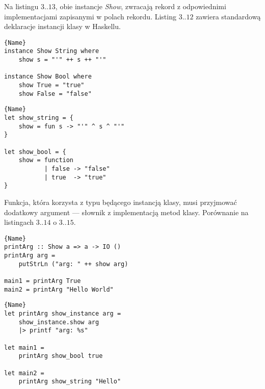 \documentclass[declaration,shortabstract]{iithesis}
\begin{document}
Na listingu $3..13$, obie instancje \textit{Show}, zwracają 
rekord z odpowiednimi implementacjami zapisanymi w polach rekordu. 
Listing $3..12$ zawiera standardową deklaracje instancji klasy w Haskellu.

\noindent\begin{minipage}{.45\textwidth}
\begin{lstlisting}[caption=Instancja klasy w Haskellu, frame=tlrb]{Name}
instance Show String where
    show s = "'" ++ s ++ "'"

instance Show Bool where
    show True = "true"
    show False = "false" 

\end{lstlisting}
\end{minipage}\hfill
\begin{minipage}{.45\textwidth}
\begin{lstlisting}[caption=Instancja klasy w OCamlu, frame=tlrb]{Name}
let show_string = {
    show = fun s -> "'" ^ s ^ "'"
}

let show_bool = {
    show = function 
           | false -> "false"
           | true  -> "true"
}

\end{lstlisting}
\end{minipage}

Funkcja, która korzysta z typu będącego instancją klasy, musi przyjmować 
dodatkowy argument --- słownik z implementacją metod klasy. Porównanie na 
listingach $3..14$ o $3..15$.

\noindent\begin{minipage}{.45\textwidth}
\begin{lstlisting}[caption=Instancja klasy w Haskellu., frame=tlrb]{Name}
printArg :: Show a => a -> IO ()
printArg arg = 
    putStrLn ("arg: " ++ show arg)

main1 = printArg True
main2 = printArg "Hello World"
\end{lstlisting}
\end{minipage}\hfill
\begin{minipage}{.45\textwidth}
\begin{lstlisting}[caption=Instancja klasy w OCamlu., frame=tlrb]{Name}
let printArg show_instance arg = 
    show_instance.show arg
    |> printf "arg: %s" 

let main1 = 
    printArg show_bool true 

let main2 = 
    printArg show_string "Hello"
\end{lstlisting}
\end{minipage}
\end{document}
